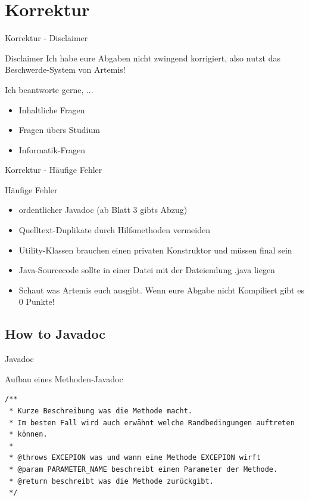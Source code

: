 \documentclass[aspectratio=169]{beamer}
\begin{document}
\section{Korrektur}
\begin{frame}{Korrektur - Disclaimer}
  \begin{alertblock}{Disclaimer}
    Ich habe eure Abgaben nicht zwingend korrigiert, also nutzt das Beschwerde-System von Artemis!
  \end{alertblock}

  \begin{block}{Ich beantworte gerne, ...}
    \begin{itemize}
      \item Inhaltliche Fragen
      \item Fragen übers Studium
      \item Informatik-Fragen
    \end{itemize}
  \end{block}
\end{frame}

\begin{frame}{Korrektur - Häufige Fehler}
  \begin{block}{Häufige Fehler}
    \begin{itemize}
      \pause
      \item ordentlicher Javadoc (\color{alertcolor}ab Blatt 3 gibts Abzug\color{FGround})
      \pause
      \item Quelltext-Duplikate durch Hilfsmethoden vermeiden
      \pause
      \item Utility-Klassen brauchen einen privaten Konstruktor und müssen \color{keywordcolor}final \color{FGround}sein
      \pause
      \item Java-Sourcecode sollte in einer Datei mit der Dateiendung .java liegen
      \pause
      \item Schaut was Artemis euch ausgibt. Wenn eure Abgabe nicht Kompiliert gibt es 0 Punkte!
    \end{itemize}
  \end{block}
\end{frame}

\subsection{How to Javadoc}

\begin{frame}[fragile]{Javadoc}
  \begin{exampleblock}{Aufbau eines Methoden-Javadoc}
    \begin{lstlisting}
/**
 * Kurze Beschreibung was die Methode macht.
 * Im besten Fall wird auch erwähnt welche Randbedingungen auftreten
 * können.
 *
 * @throws EXCEPION was und wann eine Methode EXCEPION wirft
 * @param PARAMETER_NAME beschreibt einen Parameter der Methode.
 * @return beschreibt was die Methode zurückgibt.
 */
    \end{lstlisting}
  \end{exampleblock}
\end{frame}
\end{document}
